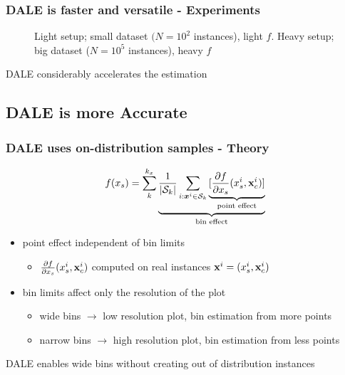 \begin{frame}
  \frametitle{DALE is faster and versatile - Experiments}
  \begin{figure}[h]
    \centering
    \resizebox{.4\columnwidth}{!}{}
    \resizebox{.43\columnwidth}{!}{}
    \caption[Case-1-fig-1]{Light setup; small dataset \((N=10^2\) instances), light \(f\). Heavy setup; big dataset (\(N=10^5\) instances), heavy \(f\)}
    \label{fig:case-1-plots-1}
  \end{figure}

  \noindent\makebox[\linewidth]{\rule{\paperwidth}{0.4pt}}
  DALE considerably accelerates the estimation
\end{frame}


\subsection{DALE is more Accurate}

\begin{frame}
  \frametitle{DALE uses on-distribution samples - Theory}
  \[f(x_s) = \sum_k^{k_x} \underbrace{\frac{1}{|\mathcal{S}_k|}
    \sum_{i:\boldsymbol{x}^i \in \mathcal{S}_k} \underbrace{[\frac{\partial
          f}{\partial x_s}(x_s^i, \mathbf{x}^i_c)]}_{\text{point
        effect}}}_{\text{bin effect}} \]

  \begin{itemize}
  \item point effect \alert{independent} of bin limits
    \begin{itemize}
    \item \(\frac{\partial f}{\partial x_s}(x_s^i, \mathbf{x}^i_c)\)
      computed on real instances \(\mathbf{x}^i = (x_s^i, \mathbf{x}_c^i)\)
    \end{itemize}
  \item bin limits affect only the \alert{resolution} of the plot
    \begin{itemize}
    \item wide bins \(\rightarrow\) low resolution plot, bin
      estimation from more points
    \item narrow bins \(\rightarrow\) high resolution plot, bin
      estimation from less points
    \end{itemize}
  \end{itemize}
  \noindent\makebox[\linewidth]{\rule{\paperwidth}{0.4pt}}
  DALE enables wide bins without creating out of distribution instances
\end{frame}


